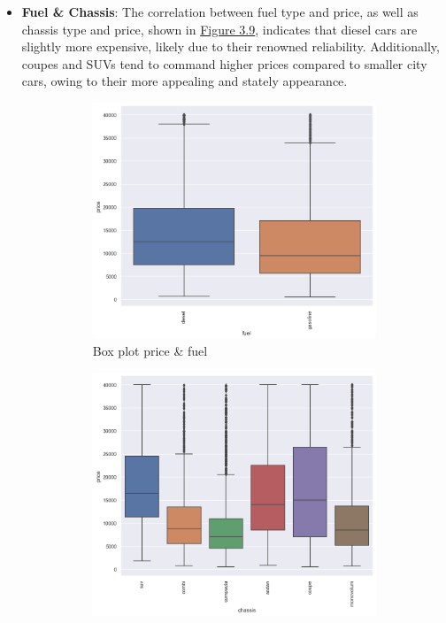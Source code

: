 \begin{itemize}
    \item \textbf{Fuel \& Chassis}: The correlation between fuel type and price, as well as chassis type and price, shown in \hyperref[fig:fuel-chassis-analysis]{Figure 3.9}, indicates that diesel cars are slightly more expensive, likely due to their renowned reliability. Additionally, coupes and SUVs tend to command higher prices compared to smaller city cars, owing to their more appealing and stately appearance.

    \begin{figure}[!h]
        \begin{subfigure}[b]{0.48\linewidth}
            \centering
            \includegraphics[width=\linewidth]{images/priceprediction/boxplots/fuel_price.png}
            \caption{Box plot price \& fuel}
            \label{fig:fuel-box}
        \end{subfigure}
        \hfill
        \begin{subfigure}[b]{0.48\linewidth}
            \centering
            \includegraphics[width=\linewidth]{images/priceprediction/boxplots/chassis_price.png}

\end{subfigure}
\end{figure}
\end{itemize}
